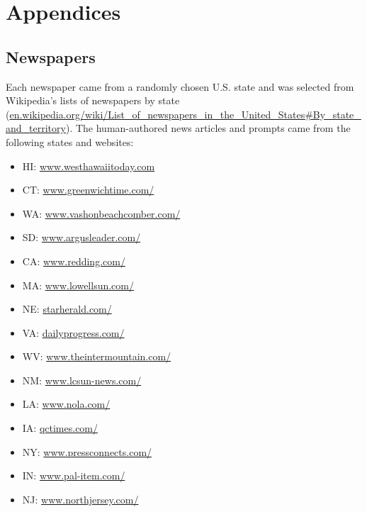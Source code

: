 \clearpage\newpage
\appendix
\section{Appendices}
\label{sec:appendix}


\subsection{Newspapers}\label{app:newspapers}
Each newspaper came from a randomly chosen U.S. state and was selected from Wikipedia's lists of newspapers by state (\url{en.wikipedia.org/wiki/List_of_newspapers_in_the_United_States\#By_state_and_territory}).
The human-authored news articles and prompts came from the following states and websites:
\begin{itemize}[noitemsep]
    \item HI: \url{www.westhawaiitoday.com}
    \item CT: \url{www.greenwichtime.com/}
    \item WA: \url{www.vashonbeachcomber.com/}
    \item SD: \url{www.argusleader.com/}
    \item CA: \url{www.redding.com/}
    \item MA: \url{www.lowellsun.com/}
    \item NE: \url{starherald.com/}
    \item VA: \url{dailyprogress.com/}
    \item WV: \url{www.theintermountain.com/}
    \item NM: \url{www.lcsun-news.com/}
    \item LA: \url{www.nola.com/}
    \item IA: \url{qctimes.com/}
    \item NY: \url{www.pressconnects.com/}
    \item IN: \url{www.pal-item.com/}
    \item NJ: \url{www.northjersey.com/}
\end{itemize}


